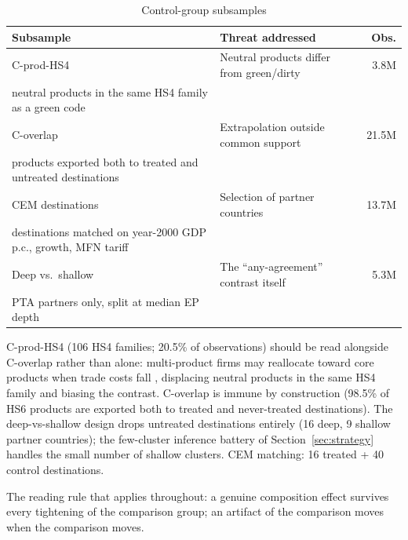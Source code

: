 \documentclass[12pt]{article}
\begin{document}
\begin{table}[htbp]
\centering
\caption{Control-group subsamples}
\label{tab:samples}
\small
\begin{threeparttable}
\begin{tabular}{llr}
\toprule
Subsample & Threat addressed & Obs. \\
\midrule
C-prod-HS4 & Neutral products differ from green/dirty & 3.8M \\
\quad neutral products in the same HS4 family as a green code & & \\
\addlinespace
C-overlap & Extrapolation outside common support & 21.5M \\
\quad products exported both to treated and untreated destinations & & \\
\addlinespace
CEM destinations & Selection of partner countries & 13.7M \\
\quad destinations matched on year-2000 GDP p.c., growth, MFN tariff & & \\
\addlinespace
Deep vs.\ shallow & The ``any-agreement'' contrast itself & 5.3M \\
\quad PTA partners only, split at median EP depth & & \\
\bottomrule
\end{tabular}
\begin{tablenotes}\footnotesize
\item C-prod-HS4 (106 HS4 families; 20.5\% of observations) should be read alongside C-overlap rather than alone: multi-product firms may reallocate toward core products when trade costs fall \citep{eckel2010}, displacing neutral products in the same HS4 family and biasing the contrast. C-overlap is immune by construction (98.5\% of HS6 products are exported both to treated and never-treated destinations). The deep-vs-shallow design drops untreated destinations entirely (16 deep, 9 shallow partner countries); the few-cluster inference battery of Section~\ref{sec:strategy} handles the small number of shallow clusters. CEM matching: 16 treated + 40 control destinations.
\end{tablenotes}
\end{threeparttable}
\end{table}

The reading rule that applies throughout: a genuine composition effect survives every
tightening of the comparison group; an artifact of the comparison moves when the
comparison moves.

\end{document}

